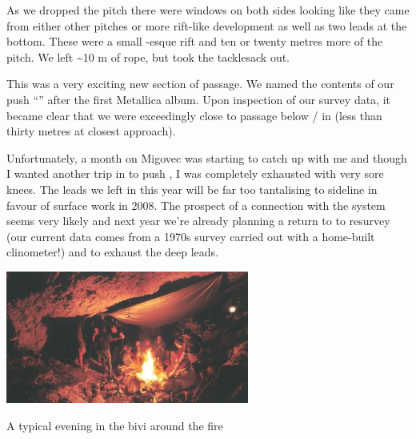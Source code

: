 As we dropped the pitch there were windows on both sides looking like
they came from either other pitches or more rift-like development as
well as two leads at the bottom. These were a small -esque rift and ten or twenty metres more of the pitch. We left
\textasciitilde{}10 m of rope, but took the tacklesack out.

This was a very exciting new section of passage. We named the contents
of our push ``'' after the first Metallica album. Upon
inspection of our survey data, it became clear that we were exceedingly
close to passage below / in  (less than thirty
metres at closest approach).

Unfortunately, a month on Migovec was starting to catch up with me and
though I wanted another trip in  to push , I
was completely exhausted with very sore knees. The leads we left in
 this year will be far too tantalising to sideline in favour of
surface work in 2008. The prospect of a connection with the system seems
very likely and next year we're already planning a return to 
to resurvey (our current data comes from a 1970s survey carried out with
a home-built clinometer!) and to exhaust the deep leads.


\begin{pagefigure}
\checkoddpage \ifoddpage \forcerectofloat \else \forceversofloat \fi
   \centering
\includegraphics[width = 0.6\textwidth]{2007/kangaroo/jarvist frost gr1 film2 -031_28.jpg}
\caption{A typical evening in the bivi around the fire }
\end{pagefigure}

